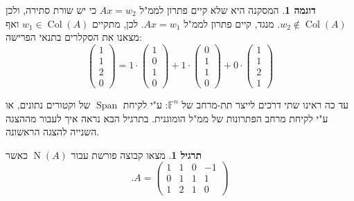 \documentclass[12pt]{report}
\theoremstyle{plain}
\theoremstyle{definition}
\newtheorem{example}{דוגמה}[chapter]
\newtheorem{exercise}{תרגיל}[chapter]
\newcommand{\F}{\mathbb{F}}
\newcommand{\0}{\mathbf{0}}
\DeclareMathOperator{\Span}{Span}
\DeclareMathOperator{\Col}{Col}
\DeclareMathOperator{\Null}{N}
\begin{document}
\begin{example}
המסקנה היא שלא קיים פתרון לממ"ל
$Ax=w_2$
כי יש שורת סתירה, ולכן 
$w_2\notin\Col(A)$.
מנגד, קיים פתרון לממ"ל
$Ax=w_1$.
לכן, מתקיים 
$w_1\in\Col(A)$
ואף מצאנו את הסקלרים בתנאי הפרישה:
$$
\begin{pmatrix}
1\\
1\\
2\\
0
\end{pmatrix}=1\cdot\begin{pmatrix}
1 \\
0 \\
1 \\
0
\end{pmatrix}+1\cdot\begin{pmatrix}
0 \\
1 \\
1 \\
0 
\end{pmatrix} +0\cdot\begin{pmatrix}
1\\
1\\
2\\
1
\end{pmatrix}
$$

\end{example}

עד כה ראינו שתי דרכים לייצר תת-מרחב של
$\F^n$:
ע"י לקיחת
$\Span$
של וקטורים נתונים, או ע"י לקיחת מרחב הפתרונות של ממ"ל הומוגנית. בתרגיל הבא נראה איך לעבור מההצגה השנייה להצגה הראשונה.

\begin{exercise}
מצאו קבוצה פורשת עבור 
$\Null(A)$
כאשר
$$
.A=\begin{pmatrix}
1 & 1 & 0 & -1 \\
0 & 1 & 1 & 1 \\
1 & 2 & 1 & 0
\end{pmatrix}
$$
\end{exercise}
\end{document}
